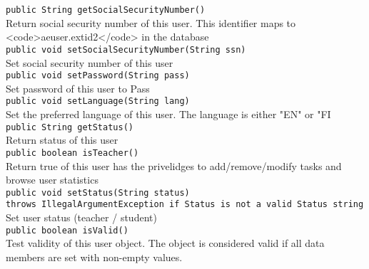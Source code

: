 {\tt		public String getSocialSecurityNumber()} \\ 
Return social security number of this user. This identifier maps to <code>aeuser.extid2</code> in the database\\
	
{\tt		public void setSocialSecurityNumber(String ssn)} \\ 
Set social security number of this user\\
	
{\tt		public void setPassword(String pass)} \\ 
Set password of this user to Pass\\
	
{\tt		public void setLanguage(String lang)} \\ 
Set the preferred language of this user. The language is either "EN" or "FI\\

{\tt		public String getStatus()} \\
Return status of this user\\
	
{\tt		public boolean isTeacher()} \\ 
Return true of this user has the privelidges to add/remove/modify tasks and browse user statistics\\

{\tt		public void setStatus(String status)} \\  
{\tt		throws IllegalArgumentException if Status is not a valid Status string}\\
Set user status (teacher / student)\\
	
{\tt		public boolean isValid()} \\
Test validity of this user object. The object is considered valid if all data members are set with non-empty values.\\





